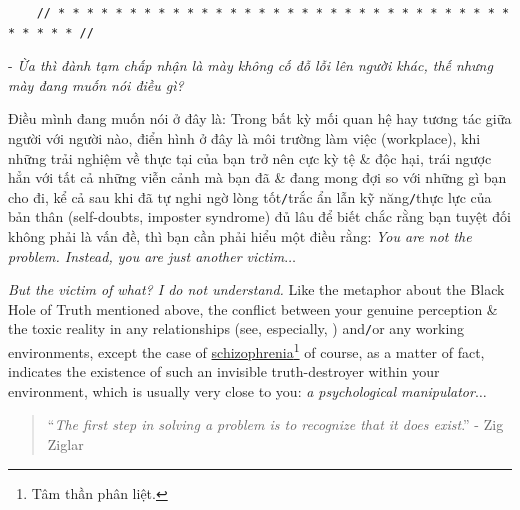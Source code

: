 \documentclass[12pt]{article}
\begin{document}
\begin{verbatim}
	// * * * * * * * * * * * * * * * * * * * * * * * * * * * * * * * * * * * * * //
\end{verbatim}

\noindent
{} - {\it Ừa thì đành tạm chấp nhận là mày không cố đỗ lỗi lên người khác, thế nhưng mày đang muốn nói điều gì?}

Điều mình đang muốn nói ở đây là: Trong bất kỳ mối quan hệ hay tương tác giữa người với người nào, điển hình ở đây là môi trường làm việc (workplace), khi những trải nghiệm về thực tại của bạn trở nên cực kỳ tệ \& độc hại, trái ngược hẳn với tất cả những viễn cảnh mà bạn đã \& đang mong đợi so với những gì bạn cho đi, kể cả sau khi đã tự nghi ngờ lòng tốt{\tt/}trắc ẩn lẫn kỹ năng{\tt/}thực lực của bản thân (self-doubts, imposter syndrome) đủ lâu để biết chắc rằng bạn tuyệt đối không phải là vấn đề, thì bạn cần phải hiểu một điều rằng: {\it You are not the problem. Instead, you are just another victim}$\ldots$

{\it But the victim of what? I do not understand.} Like the metaphor about the Black Hole of Truth mentioned above, the conflict between your genuine perception \& the toxic reality in any relationships (see, especially, \cite{Bancroft_why_he_do,Bancroft_why_he_do_VN}) and{\tt/}or any working environments, except the case of \href{https://en.wikipedia.org/wiki/Schizophrenia}{schizophrenia}\footnote{Tâm thần phân liệt.} of course, as a matter of fact, indicates the existence of such an invisible truth-destroyer within your environment, which is usually very close to you: {\it a psychological manipulator}$\ldots$

\begin{quotation}
	``{\it The first step in solving a problem is to recognize that it does exist}.'' - Zig Ziglar
\end{quotation}
\end{document}
